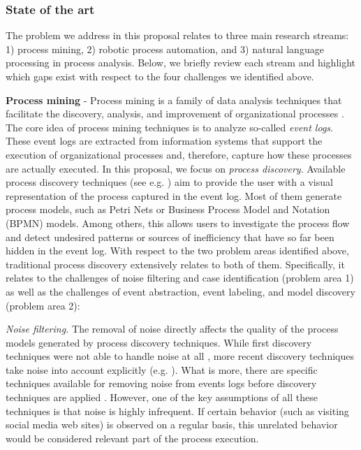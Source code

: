  
\subsubsection{State of the art} 
 \label{sec:stateoftheart}
 
The problem we address in this proposal relates to three main research streams: 1) process mining, 2) robotic process automation, and 3) natural language processing in process analysis. Below, we briefly review each stream and highlight which gaps exist with respect to the four challenges we identified above.  

\textbf{Process mining} - Process mining is a family of data analysis techniques that facilitate the discovery, analysis, and improvement of organizational processes \cite{van2016data}. The core idea of process mining techniques is to analyze so-called \textit{event logs}. These event logs are extracted from information systems that support the execution of organizational processes and, therefore, capture how these processes are actually executed. In this proposal, we focus on \textit{process discovery}. Available process discovery techniques (see e.g. \cite{gunther2007fuzzy,weijters2011flexible,leemans2013discovering}) aim to provide the user with a visual representation of the process captured in the event log. Most of them generate process models, such as Petri Nets or Business Process Model and Notation (BPMN) models. Among others, this allows users to investigate the process flow and detect undesired patterns or sources of inefficiency that have so far been hidden in the event log. With respect to the two problem areas identified above, traditional process discovery extensively relates to both of them. Specifically, it relates to the challenges of noise filtering and case identification (problem area 1) as well as the challenges of event abstraction, event labeling, and model discovery (problem area 2):

\textit{Noise filtering.} The removal of noise directly affects the quality of the process models generated by process discovery techniques. While first discovery techniques were not able to handle noise at all \cite{van2004workflow}, more recent discovery techniques take noise into account explicitly (e.g. \cite{weijters2003rediscovering,leemans2013discovering,van2016avoiding}). What is more, there are specific techniques available for removing noise from events logs before discovery techniques are applied \cite{tax2017discovering,CHENG2015138}. However, one of the key assumptions of all these techniques is that noise is highly infrequent. If certain behavior (such as visiting social media web sites) is observed on a regular basis, this unrelated behavior would be considered relevant part of the process execution. 


